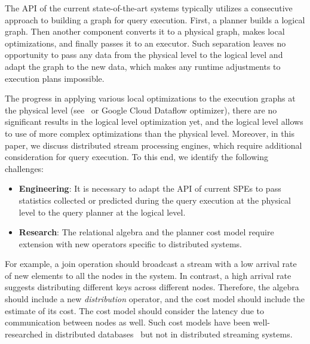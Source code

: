 The API of the current state-of-the-art systems typically utilizes a consecutive approach to building a graph for query execution. First, a planner builds a logical graph. Then another component converts it to a physical graph, makes local optimizations, and finally passes it to an executor.
Such separation leaves no opportunity to pass any data from the physical level to the logical level and adapt the graph to the new data, which makes any runtime adjustments to execution plans impossible. 

The progress in applying various local optimizations to the execution graphs at the physical level (see~\cite{grulich2020grizzly} or Google Cloud Dataflow optimizer), there are no significant results in the logical level optimization yet, and the logical level allows to use of more complex optimizations than the physical level. 
Moreover, in this paper, we discuss distributed stream processing engines, which require additional consideration for query execution. To this end, we identify the following challenges:

\begin{itemize}
    \item \textbf{Engineering}: 
    It is necessary to adapt the API of current SPEs to pass statistics collected or predicted during the query execution at the physical level to the query planner at the logical level.
    
    \item \textbf{Research}: 
    The relational algebra and the planner cost model require extension with new operators specific to distributed systems.
\end{itemize}

For example, a join operation should broadcast a stream with a low arrival rate of new elements to all the nodes in the system. 
In contrast, a high arrival rate suggests distributing different keys across different nodes. 
Therefore, the algebra should include a new \textit{distribution} operator, and the cost model should include the estimate of its cost. The cost model should consider the latency due to communication between nodes as well. Such cost models have been well-researched in distributed databases~\cite{kossmann2000thestate} but not in distributed streaming systems.



